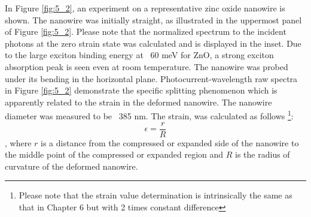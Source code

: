 In Figure \ref{fig:5_2}, an experiment on a representative zinc oxide nanowire is shown. The nanowire was initially straight, as illustrated in the uppermost panel of Figure \ref{fig:5_2}. 
Please note that the normalized spectrum to the incident photons at the zero strain state was calculated and is displayed in the inset. 
Due to the large exciton binding energy at ~60 meV for ZnO, a strong exciton absorption peak is seen even at room temperature. 
The nanowire was probed under its bending in the horizontal plane. 
Photocurrent-wavelength raw spectra in Figure \ref{fig:5_2} demonstrate the specific splitting phenomenon which is apparently related to the strain in the deformed nanowire. 
The nanowire diameter was measured to be ~385 nm. 
The strain, was calculated as follows \footnote{Please note that the strain value determination is intrinsically the same as that in  Chapter 6 but with  2 times constant difference }: $$\epsilon = \frac{r}{R} $$
, where $r$ is a distance from the compressed or expanded side of the nanowire to the middle point of the compressed or expanded region and $R$ is the radius of curvature of the deformed nanowire. \\

